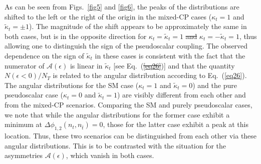 \documentclass[aps,preprint,tightenlines,floatfix,superscriptaddress,nofootinbib,showpacs]{revtex4-1}
\def\tbar{\bar{t}}
\def\kp{\kappa_t}
\def\kpt{\tilde{\kappa}_t}
\providecommand{\DIFadd}[1]{{\protect\color{blue}\uwave{#1}}} %
\providecommand{\DIFdel}[1]{{\protect\color{red}\sout{#1}}}                      %
\providecommand{\DIFaddbegin}{} %
\providecommand{\DIFaddend}{} %
\providecommand{\DIFdelbegin}{} %
\providecommand{\DIFdelend}{} %
\begin{document}
\par As can be seen from Figs.~\ref{fig5} and \ref{fig6}, the
peaks of the 
distributions are shifted to the left or the right of the origin
in the mixed-$\mathrm{CP}$
cases ($\kp =1$ and $\kpt=\pm 1$).
The magnitude of the shift appears to be approximately the
same in both cases, but is in the
opposite direction for $\kp=\kpt=1$ \DIFdelbegin \DIFdel{and }\DIFdelend \DIFaddbegin \DIFadd{compared to }\DIFaddend $\kp=-\kpt=1$, thus allowing
one to distinguish
the sign of the pseudoscalar coupling. The observed dependence
on the sign of $\kpt$ in these cases
is consistent with the fact that the numerator of $\mathcal{A}(\epsilon)$
is linear in $\kpt$ [see Eq.~(\DIFdelbegin \DIFdel{\ref{eq26}}\DIFdelend \DIFaddbegin \DIFadd{\ref{eq23}}\DIFaddend )]
and that the quantity $N(\epsilon < 0)/N_T$ is related
to the angular distribution according to Eq.~(\ref{eq26}). The angular
distributions for the SM case ($\kp =1$ and $\kpt=0$) and
the pure pseudoscalar case ($\kp =0$ and $\kpt= 1$) are
visibly different from each other and from the mixed-$\mathrm{CP}$
scenarios. Comparing the SM and purely pseudoscalar cases,
we note that while the angular distributions for the former case
exhibit a minimum at $\Delta\phi_{1,2}(n_t,n_{\tbar})=0$, those
for the latter case exhibit a peak at this location.
Thus, these two scenarios can be distinguished from each other
via these angular distributions.  This is to be contrasted
with the situation for the asymmetries $\mathcal{A}(\epsilon)$, which vanish
in both cases.
\DIFaddbegin 
\end{document}
